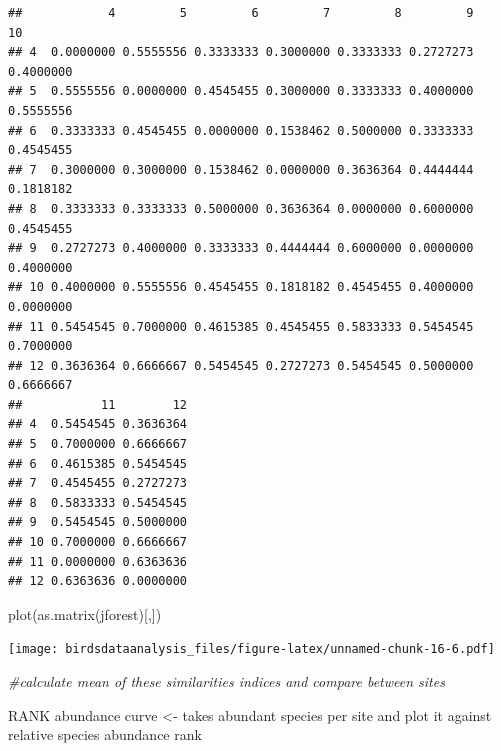 \documentclass[
]{article}
\newenvironment{Shaded}{\begin{snugshade}}{\end{snugshade}}
\newcommand{\CommentTok}[1]{\textcolor[rgb]{0.56,0.35,0.01}{\textit{#1}}}
\newcommand{\FunctionTok}[1]{\textcolor[rgb]{0.00,0.00,0.00}{#1}}
\newcommand{\NormalTok}[1]{#1}
\begin{document}
\begin{verbatim}
##            4         5         6         7         8         9        10
## 4  0.0000000 0.5555556 0.3333333 0.3000000 0.3333333 0.2727273 0.4000000
## 5  0.5555556 0.0000000 0.4545455 0.3000000 0.3333333 0.4000000 0.5555556
## 6  0.3333333 0.4545455 0.0000000 0.1538462 0.5000000 0.3333333 0.4545455
## 7  0.3000000 0.3000000 0.1538462 0.0000000 0.3636364 0.4444444 0.1818182
## 8  0.3333333 0.3333333 0.5000000 0.3636364 0.0000000 0.6000000 0.4545455
## 9  0.2727273 0.4000000 0.3333333 0.4444444 0.6000000 0.0000000 0.4000000
## 10 0.4000000 0.5555556 0.4545455 0.1818182 0.4545455 0.4000000 0.0000000
## 11 0.5454545 0.7000000 0.4615385 0.4545455 0.5833333 0.5454545 0.7000000
## 12 0.3636364 0.6666667 0.5454545 0.2727273 0.5454545 0.5000000 0.6666667
##           11        12
## 4  0.5454545 0.3636364
## 5  0.7000000 0.6666667
## 6  0.4615385 0.5454545
## 7  0.4545455 0.2727273
## 8  0.5833333 0.5454545
## 9  0.5454545 0.5000000
## 10 0.7000000 0.6666667
## 11 0.0000000 0.6363636
## 12 0.6363636 0.0000000
\end{verbatim}

\begin{Shaded}
\begin{Highlighting}[]
\FunctionTok{plot}\NormalTok{(}\FunctionTok{as.matrix}\NormalTok{(jforest)[,])}
\end{Highlighting}
\end{Shaded}

\texttt{[image: birdsdataanalysis\_files/figure-latex/unnamed-chunk-16-6.pdf]}

\begin{Shaded}
\begin{Highlighting}[]
\CommentTok{\#calculate mean of these similarities indices and compare between sites}
\end{Highlighting}
\end{Shaded}

RANK abundance curve \textless- takes abundant species per site and plot
it against relative species abundance rank
\end{document}
